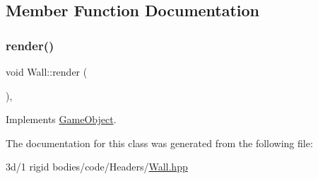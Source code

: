 \subsection{Member Function Documentation}
\mbox{\label{class_wall_ad2b19eb994789ac7588b61a7ad0d928f}} 
\subsubsection{\texorpdfstring{render()}{render()}}
{\footnotesize\ttfamily void Wall\+::render (\begin{DoxyParamCaption}{ }\end{DoxyParamCaption})\hspace{0.3cm}{\ttfamily [override]}, {\ttfamily [virtual]}}



Implements \mbox{\hyperlink{class_game_object_adee58d508cfa907162d1192a25dc21b9}{Game\+Object}}.



The documentation for this class was generated from the following file\+:\begin{DoxyCompactItemize}
\item 
3d/1 rigid bodies/code/\+Headers/\mbox{\hyperlink{_wall_8hpp}{Wall.\+hpp}}\end{DoxyCompactItemize}
